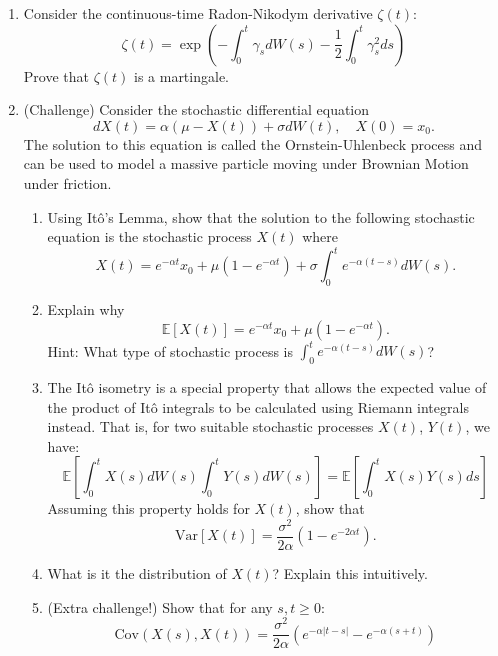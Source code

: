 \documentclass[11pt]{article}
\newcommand{\E}{\mathbb{E}}
\begin{document}
\begin{enumerate}
\begin{enumerate}
			\end{enumerate}
		\item Consider the continuous-time Radon-Nikodym derivative $\zeta(t)$:
		\[	\zeta(t) = \exp\left(-\int_{0}^{t}\gamma_{s}dW(s) -\frac{1}{2} \int_{0}^{t}\gamma_{s}^{2}ds\right)
			\]
		Prove that $\zeta(t)$ is a martingale.
		\item (Challenge) Consider the stochastic differential equation
		\[	dX(t) = \alpha(\mu - X(t))+ \sigma dW(t),\quad X(0) = x_{0}.
		\]
		The solution to this equation is called the Ornstein-Uhlenbeck process and can be used to model a massive particle moving under Brownian Motion under friction.
		\begin{enumerate}
			\item Using It\^{o}'s Lemma, show that the solution to the following stochastic equation
			is the stochastic process $X(t)$ where
			\[	X(t) = e^{-\alpha t}x_{0} + \mu(1 - e^{-\alpha t}) + \sigma\int_{0}^{t}e^{-\alpha(t - s)}dW(s).
			\]
			\item Explain why 
			\[	\E[X(t)] = e^{-\alpha t}x_{0} + \mu(1 - e^{-\alpha t}).
				\]
			Hint: What type of stochastic process is $\int_{0}^{t}e^{-\alpha(t - s)}dW(s)$?
			\item The It\^{o} isometry is a special property that allows the expected value of the product of It\^{o} integrals to be calculated using Riemann integrals instead. That is, for two suitable stochastic processes $X(t)$, $Y(t)$, we have:
			\[	\E\left[\int_{0}^{t}X(s)dW(s)\int_{0}^{t}Y(s)dW(s)\right]
				 = \E\left[\int_{0}^{t}X(s)Y(s)ds\right]
				\]
			Assuming this property holds for $X(t)$, show that
			\[	\text{Var}[X(t)] = \frac{\sigma^{2}}{2\alpha}(1 - e^{-2\alpha t}).
				\]
			\item What is it the distribution of $X(t)$? Explain this intuitively.
			\item (Extra challenge!) Show that for any $s, t\geq 0$:
			\[	\text{Cov}(X(s), X(t)) = \frac{\sigma^{2}}{2\alpha}(e^{-\alpha|t - s|} - e^{-\alpha(s + t)})
				\]
		\end{enumerate}
		 
	\end{enumerate}
	
\end{document}
